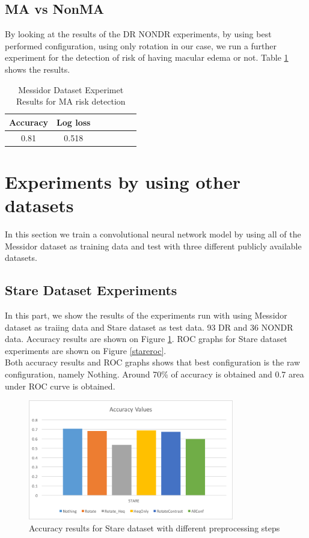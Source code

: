 \subsection{MA vs NonMA}
By looking at the results of the DR NONDR experiments, by using best performed configuration, using only rotation in our case, we run a further experiment for the detection of risk of having macular edema or not. Table \ref{tab:msdma} shows the results.  

\begin{table}[t]
\centering
\caption{Messidor Dataset Experimet Results for MA risk detection} \label{tab:msdma}
\begin{tabular}{|c|c|c|c|c|c|c|} \hline
 Accuracy & Log loss \\ \hline
 0.81 & 0.518\\ \hline
\end{tabular}
\end{table}

\section{Experiments by using other datasets}
In this section we train a convolutional neural network model by using all of the Messidor dataset as training data and test with three different publicly available datasets.
\subsection{Stare Dataset Experiments}
In this part, we show the results of the experiments run with using Messidor dataset as traiing data and Stare dataset as test data. 93 DR and 36 NONDR data. Accuracy results are shown on Figure \ref{stareacc}. ROC graphs for Stare dataset experiments are shown on Figure \ref{stareroc}.\\
Both accuracy results and ROC graphs shows that best configuration is the raw configuration, namely Nothing. Around 70\% of accuracy is obtained and 0.7 area under ROC curve is obtained.   

\begin{figure}[!htbbp]
\centering
\includegraphics[width=0.8\textwidth]{Figures/stareacc.png}
\caption{Accuracy results for Stare dataset with different preprocessing steps}
\label{stareacc}
\end{figure}

